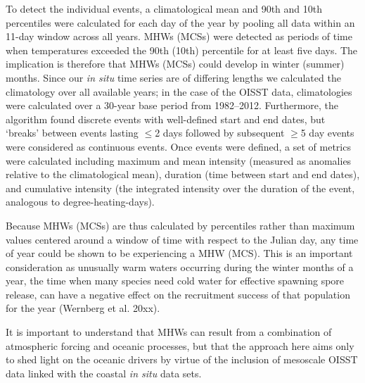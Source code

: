 \documentclass[a4paper,10pt,review]{elsarticle}
\begin{document}
To detect the individual events, a climatological mean and 90th and 10th percentiles were calculated for each day of the year by pooling all data within an 11-day window across all years. MHWs (MCSs) were detected as periods of time when temperatures exceeded the 90th (10th) percentile for at least five days. The implication is therefore that MHWs (MCSs) could develop in winter (summer) months. Since our \emph{in situ} time series are of differing lengths we calculated the climatology over all available years; in the case of the OISST data, climatologies were calculated over a 30-year base period from 1982--2012. Furthermore, the algorithm found discrete events with well-defined start and end dates, but `breaks' between events lasting $\leq$2 days followed by subsequent $\geq$5 day events were considered as continuous events. Once events were defined, a set of metrics were calculated including maximum and mean intensity (measured as anomalies relative to the climatological mean), duration (time between start and end dates), and cumulative intensity (the integrated intensity over the duration of the event, analogous to degree-heating-days).

Because MHWs (MCSs) are thus calculated by percentiles rather than maximum values centered around a window of time with respect to the Julian day, any time of year could be shown to be experiencing a MHW (MCS). This is an important consideration as unusually warm waters occurring during the winter months of a year, the time when many species need cold water for effective spawning spore release, can have a negative effect on the recruitment success of that population for the year (Wernberg et al. 20xx).

It is important to understand that MHWs can result from a combination of atmospheric forcing and oceanic processes, but that the approach here aims only to shed light on the oceanic drivers by virtue of the inclusion of mesoscale OISST data linked with the coastal \emph{in situ} data sets.
\end{document}
